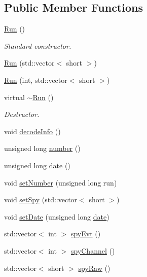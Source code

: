 \subsection*{Public Member Functions}
\begin{DoxyCompactItemize}
\item 
\hyperlink{classRun_ad9511732117430d7fcdc0c11796f0ef6}{Run} ()
\begin{DoxyCompactList}\small\item\em Standard constructor. \end{DoxyCompactList}\item 
\hyperlink{classRun_a45e6035b7001cde5d949b407faf0d8ca}{Run} (std\+::vector$<$ short $>$)
\item 
\hyperlink{classRun_aa9d670242947e1dc0e31ea68a7938611}{Run} (int, std\+::vector$<$ short $>$)
\item 
virtual \hyperlink{classRun_a7fa0ac1770a5067113aaa1928be3d742}{$\sim$\+Run} ()
\begin{DoxyCompactList}\small\item\em Destructor. \end{DoxyCompactList}\item 
void \hyperlink{classRun_a2b2687a21cbe4b0b528bdb802a0ee585}{decode\+Info} ()
\item 
unsigned long \hyperlink{classRun_aab2f7571f6348643011d538d05200f46}{number} ()
\item 
unsigned long \hyperlink{classRun_ae5f87d35674ded8f7a0d0ca3d842a7b4}{date} ()
\item 
void \hyperlink{classRun_a0ad734e3ee75d2b58631e5b237a55f5d}{set\+Number} (unsigned long run)
\item 
void \hyperlink{classRun_a391d15d3d908d3d011214dba1a075277}{set\+Spy} (std\+::vector$<$ short $>$)
\item 
void \hyperlink{classRun_ad6c534e3fdce5978250ca04791934680}{set\+Date} (unsigned long \hyperlink{classRun_ae5f87d35674ded8f7a0d0ca3d842a7b4}{date})
\item 
std\+::vector$<$ int $>$ \hyperlink{classRun_a01c526576b5b821696229b53f6afd624}{spy\+Evt} ()
\item 
std\+::vector$<$ int $>$ \hyperlink{classRun_a9ab05b137c79436688d59fba008f8078}{spy\+Channel} ()
\item 
std\+::vector$<$ short $>$ \hyperlink{classRun_af386b1e6d814454e347c5bd90b20bf2c}{spy\+Raw} ()
\end{DoxyCompactItemize}
